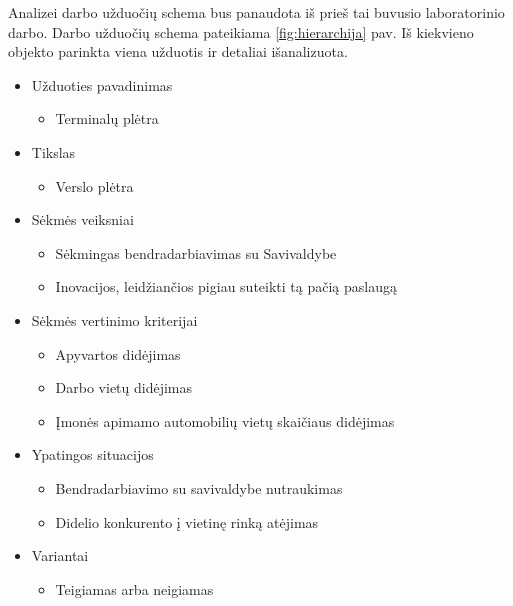 \documentclass[10pt]{IEEEtran}
\begin{document}
            Analizei darbo užduočių schema bus panaudota iš prieš tai buvusio laboratorinio darbo. Darbo užduočių schema pateikiama \ref{fig:hierarchija} pav. Iš kiekvieno objekto parinkta viena užduotis ir detaliai išanalizuota. 

            \begin{itemize}
                \item Užduoties pavadinimas
                \begin{itemize}
                    \item Terminalų plėtra
                \end{itemize}
                \item Tikslas
                \begin{itemize}
                    \item Verslo plėtra
                \end{itemize}
                \item Sėkmės veiksniai
                \begin{itemize}
                    \item Sėkmingas bendradarbiavimas su Savivaldybe
                    \item Inovacijos, leidžiančios pigiau suteikti tą pačią paslaugą
                \end{itemize}
                \item Sėkmės vertinimo kriterijai
                \begin{itemize}
                    \item Apyvartos didėjimas
                    \item Darbo vietų didėjimas
                    \item Įmonės apimamo automobilių vietų skaičiaus didėjimas
                \end{itemize}
                \item Ypatingos situacijos
                \begin{itemize}
                    \item Bendradarbiavimo su savivaldybe nutraukimas
                    \item Didelio konkurento į vietinę rinką atėjimas
                \end{itemize}
                \item Variantai
                \begin{itemize}
                    \item Teigiamas arba neigiamas
                \end{itemize}
            \end{itemize}
\end{document}
